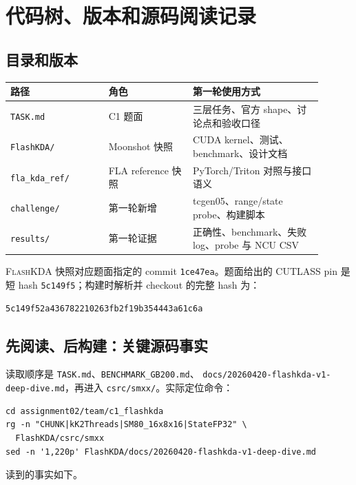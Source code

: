 \documentclass[11pt,a4paper,fontset=none]{ctexart}
\newcommand{\FlashKDA}{\textsc{FlashKDA}}
\newcommand{\code}[1]{\texttt{#1}}
\begin{document}
\section{代码树、版本和源码阅读记录}

\subsection{目录和版本}

\begin{longtable}{@{}L{0.29\linewidth}L{0.24\linewidth}L{0.37\linewidth}@{}}
\toprule
路径 & 角色 & 第一轮使用方式 \\
\midrule
\endhead
\bottomrule
\endlastfoot
\code{TASK.md} & C1 题面 & 三层任务、官方 shape、讨论点和验收口径 \\
\code{FlashKDA/} & Moonshot 快照 & CUDA kernel、测试、benchmark、设计文档 \\
\code{fla\_kda\_ref/} & FLA reference 快照 & PyTorch/Triton 对照与接口语义 \\
\code{challenge/} & 第一轮新增 & tcgen05、range/state probe、构建脚本 \\
\code{results/} & 第一轮证据 & 正确性、benchmark、失败 log、probe 与 NCU CSV \\
\end{longtable}

\FlashKDA{} 快照对应题面指定的 commit \code{1ce47ea}。题面给出的 CUTLASS
pin 是短 hash \code{5c149f5}；构建时解析并 checkout 的完整 hash 为：

\begin{lstlisting}
5c149f52a436782210263fb2f19b354443a61c6a
\end{lstlisting}

\subsection{先阅读、后构建：关键源码事实}

读取顺序是 \code{TASK.md}、\code{BENCHMARK\_GB200.md}、
\code{docs/20260420-flashkda-v1-deep-dive.md}，再进入
\code{csrc/smxx/}。实际定位命令：

\begin{lstlisting}
cd assignment02/team/c1_flashkda
rg -n "CHUNK|kK2Threads|SM80_16x8x16|StateFP32" \
  FlashKDA/csrc/smxx
sed -n '1,220p' FlashKDA/docs/20260420-flashkda-v1-deep-dive.md
\end{lstlisting}

读到的事实如下。
\end{document}
